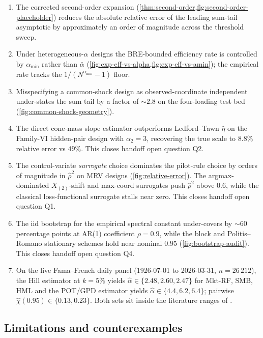 \begin{enumerate}[label=(E\arabic*),leftmargin=*]
\item The corrected second-order expansion
  (\cref{thm:second-order,fig:second-order-placeholder}) reduces the
  absolute relative error of the leading sum-tail asymptotic by
  approximately an order of magnitude across the threshold sweep.
\item Under heterogeneous-$\alpha$ designs the BRE-bounded efficiency
  rate is controlled by $\alpha_{\min}$ rather than $\bar\alpha$
  (\cref{fig:exp-eff-vs-alpha,fig:exp-eff-vs-amin}); the empirical
  rate tracks the $1/(N^{\alpha_{\min}} - 1)$ floor.
\item Misspecifying a common-shock design as observed-coordinate
  independent under-states the sum tail by a factor of $\sim 2.8$ on
  the four-loading test bed
  (\cref{fig:common-shock-geometry}).
\item The direct cone-mass slope estimator outperforms Ledford--Tawn
  $\widehat\eta$ on the Family-VI hidden-pair design with
  $\alpha_2 = 3$, recovering the true scale to $8.8\%$ relative error
  vs $49\%$. This closes handoff open question Q2.
\item The control-variate \emph{surrogate} choice dominates the
  pilot-rule choice by orders of magnitude in
  $\widehat\rho^2$ on MRV designs (\cref{fig:relative-error}). The
  argmax-dominated $X_{(2)}$-shift and max-coord surrogates push
  $\widehat\rho^2$ above $0.6$, while the classical loss-functional
  surrogate stalls near zero. This closes handoff open question Q1.
\item The iid bootstrap for the empirical spectral constant
  under-covers by $\sim 60$ percentage points at AR(1) coefficient
  $\rho = 0.9$, while the block and Politis--Romano stationary
  schemes hold near nominal $0.95$ (\cref{fig:bootstrap-audit}).
  This closes handoff open question Q4.
\item On the live Fama--French daily panel (1926-07-01 to 2026-03-31,
  $n = 26\,212$), the Hill estimator at $k = 5\%$ yields
  $\widehat\alpha \in \{2.48, 2.60, 2.47\}$ for Mkt-RF, SMB, HML and
  the POT/GPD estimator yields $\widehat\alpha \in \{4.4, 6.2, 6.4\}$;
  pairwise $\widehat\chi(0.95) \in \{0.13, 0.23\}$. Both sets sit
  inside the literature ranges of
  \citet{Gabaix2009,Cont2001,EmbrechtsMcNeilFrey2005,ChristoffersenErrunzaJacobsLangloi2012}.
\end{enumerate}

\subsection{Limitations and counterexamples}
\label{subsec:limitations}

